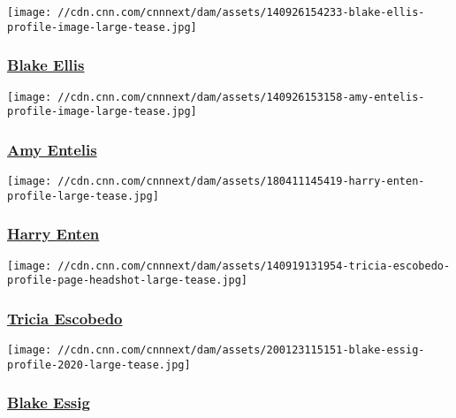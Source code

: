 \href{/profiles/blake-ellis}{}

\texttt{[image: //cdn.cnn.com/cnnnext/dam/assets/140926154233-blake-ellis-profile-image-large-tease.jpg]}

\hypertarget{blake-ellis}{%
\subsubsection{\texorpdfstring{\href{/profiles/blake-ellis}{Blake
Ellis}}{Blake Ellis}}\label{blake-ellis}}

\href{/profiles/amy-entelis-profile}{}

\texttt{[image: //cdn.cnn.com/cnnnext/dam/assets/140926153158-amy-entelis-profile-image-large-tease.jpg]}

\hypertarget{amy-entelis}{%
\subsubsection{\texorpdfstring{\href{/profiles/amy-entelis-profile}{Amy
Entelis}}{Amy Entelis}}\label{amy-entelis}}

\href{/profiles/harry-enten}{}

\texttt{[image: //cdn.cnn.com/cnnnext/dam/assets/180411145419-harry-enten-profile-large-tease.jpg]}

\hypertarget{harry-enten}{%
\subsubsection{\texorpdfstring{\href{/profiles/harry-enten}{Harry
Enten}}{Harry Enten}}\label{harry-enten}}

\href{/profiles/tricia-escobedo-profile}{}

\texttt{[image: //cdn.cnn.com/cnnnext/dam/assets/140919131954-tricia-escobedo-profile-page-headshot-large-tease.jpg]}

\hypertarget{tricia-escobedo-}{%
\subsubsection{\texorpdfstring{\href{/profiles/tricia-escobedo-profile}{Tricia
Escobedo }}{Tricia Escobedo }}\label{tricia-escobedo-}}

\href{/profiles/blake-essig}{}

\texttt{[image: //cdn.cnn.com/cnnnext/dam/assets/200123115151-blake-essig-profile-2020-large-tease.jpg]}

\hypertarget{blake-essig}{%
\subsubsection{\texorpdfstring{\href{/profiles/blake-essig}{Blake
Essig}}{Blake Essig}}\label{blake-essig}}

